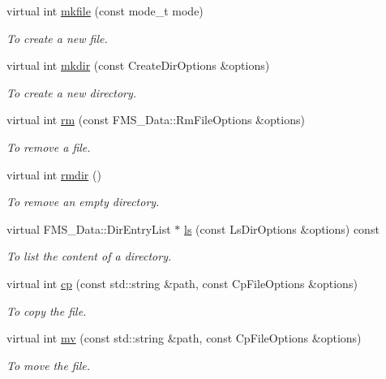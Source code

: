 \begin{DoxyCompactItemize}
virtual int \hyperlink{classSSHFile_aae0e9486c370a13469ec72cbb503638c}{mkfile} (const mode\_\-t mode)
\begin{DoxyCompactList}\small\item\em To create a new file. \item\end{DoxyCompactList}\item 
virtual int \hyperlink{classSSHFile_aa7c631c5648da18c7d0c93b23e806cb7}{mkdir} (const CreateDirOptions \&options)
\begin{DoxyCompactList}\small\item\em To create a new directory. \item\end{DoxyCompactList}\item 
virtual int \hyperlink{classSSHFile_ae967241d0e3d65fb697d53c1d483baa4}{rm} (const FMS\_\-Data::RmFileOptions \&options)
\begin{DoxyCompactList}\small\item\em To remove a file. \item\end{DoxyCompactList}\item 
virtual int \hyperlink{classSSHFile_a2e11320295a5f9a70286e4e24c2c106c}{rmdir} ()
\begin{DoxyCompactList}\small\item\em To remove an empty directory. \item\end{DoxyCompactList}\item 
virtual FMS\_\-Data::DirEntryList $\ast$ \hyperlink{classSSHFile_a4be397cf77959dbc6f730f084435662c}{ls} (const LsDirOptions \&options) const 
\begin{DoxyCompactList}\small\item\em To list the content of a directory. \item\end{DoxyCompactList}\item 
virtual int \hyperlink{classSSHFile_af656c34ec5d57decce27bbe82eba0b3f}{cp} (const std::string \&path, const CpFileOptions \&options)
\begin{DoxyCompactList}\small\item\em To copy the file. \item\end{DoxyCompactList}\item 
virtual int \hyperlink{classSSHFile_a1d803bcc5945bb06ae7434868c34baac}{mv} (const std::string \&path, const CpFileOptions \&options)
\begin{DoxyCompactList}\small\item\em To move the file. \item\end{DoxyCompactList}\end{DoxyCompactItemize}
